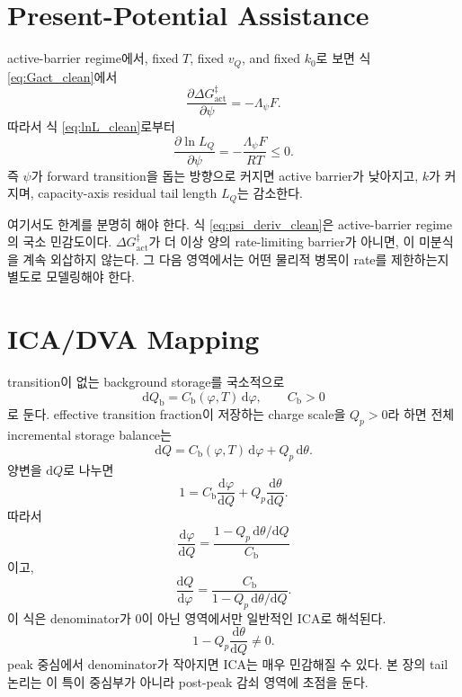 \documentclass[11pt,a4paper]{article}
\newcommand{\dd}{\mathrm{d}}
\begin{document}
\section{Present-Potential Assistance}

active-barrier regime에서, fixed \(T\), fixed \(v_Q\), and fixed \(k_0\)로 보면 식 \eqref{eq:Gact_clean}에서
\begin{equation}
\frac{\partial\Delta G_{\mathrm{act}}^\ddagger}{\partial\psi}
=
-\Lambda_\psi F .
\end{equation}
따라서 식 \eqref{eq:lnL_clean}로부터
\begin{equation}
\boxed{
\frac{\partial\ln L_Q}{\partial\psi}
=
-\frac{\Lambda_\psi F}{RT}
\le0.
}
\label{eq:psi_deriv_clean}
\end{equation}
즉 \(\psi\)가 forward transition을 돕는 방향으로 커지면 active barrier가 낮아지고, \(k\)가 커지며, capacity-axis residual tail length \(L_Q\)는 감소한다.

여기서도 한계를 분명히 해야 한다. 식 \eqref{eq:psi_deriv_clean}은 active-barrier regime의 국소 민감도이다. \(\Delta G_{\mathrm{act}}^\ddagger\)가 더 이상 양의 rate-limiting barrier가 아니면, 이 미분식을 계속 외삽하지 않는다. 그 다음 영역에서는 어떤 물리적 병목이 rate를 제한하는지 별도로 모델링해야 한다.

\section{ICA/DVA Mapping}

transition이 없는 background storage를 국소적으로
\begin{equation}
\dd Q_{\mathrm b}
=
C_{\mathrm b}(\varphi,T)\,\dd\varphi,
\qquad
C_{\mathrm b}>0
\end{equation}
로 둔다. effective transition fraction이 저장하는 charge scale을 \(Q_p>0\)라 하면 전체 incremental storage balance는
\begin{equation}
\boxed{
\dd Q
=
C_{\mathrm b}(\varphi,T)\,\dd\varphi
+
Q_p\,\dd\theta .
}
\label{eq:storage_clean}
\end{equation}
양변을 \(\dd Q\)로 나누면
\begin{equation}
1
=
C_{\mathrm b}\frac{\dd\varphi}{\dd Q}
+
Q_p\frac{\dd\theta}{\dd Q}.
\end{equation}
따라서
\begin{equation}
\boxed{
\frac{\dd\varphi}{\dd Q}
=
\frac{1-Q_p\,\dd\theta/\dd Q}{C_{\mathrm b}}
}
\label{eq:dva_clean}
\end{equation}
이고,
\begin{equation}
\boxed{
\frac{\dd Q}{\dd\varphi}
=
\frac{C_{\mathrm b}}
{1-Q_p\,\dd\theta/\dd Q}.
}
\label{eq:ica_clean}
\end{equation}
이 식은 denominator가 0이 아닌 영역에서만 일반적인 ICA로 해석된다.
\begin{equation}
1-Q_p\frac{\dd\theta}{\dd Q}\ne0 .
\label{eq:denom_clean}
\end{equation}
peak 중심에서 denominator가 작아지면 ICA는 매우 민감해질 수 있다. 본 장의 tail 논리는 이 특이 중심부가 아니라 post-peak 감쇠 영역에 초점을 둔다.
\end{document}
